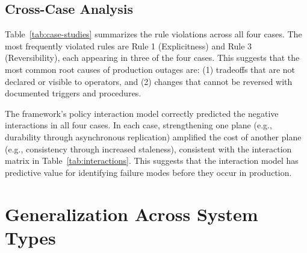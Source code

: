 \documentclass[conference]{IEEEtran}
\begin{document}
\subsection{Cross-Case Analysis}

Table~\ref{tab:case-studies} summarizes the rule violations across all four cases. The most frequently violated rules are Rule 1 (Explicitness) and Rule 3 (Reversibility), each appearing in three of the four cases. This suggests that the most common root causes of production outages are: (1) tradeoffs that are not declared or visible to operators, and (2) changes that cannot be reversed with documented triggers and procedures.

\begin{table}[t]
\caption{Rule Violations Across Case Studies}
\label{tab:case-studies}
\centering
{}
\end{table}

The framework's policy interaction model correctly predicted the negative interactions in all four cases. In each case, strengthening one plane (e.g., durability through asynchronous replication) amplified the cost of another plane (e.g., consistency through increased staleness), consistent with the interaction matrix in Table~\ref{tab:interactions}. This suggests that the interaction model has predictive value for identifying failure modes before they occur in production.

\section{Generalization Across System Types}
\end{document}
